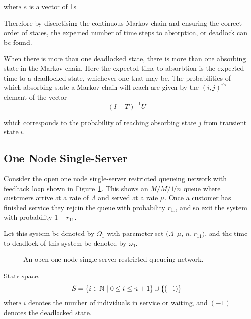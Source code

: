 \documentclass{article}
\numberwithin{equation}{section}
\begin{document}
where $e$ is a vector of 1s.

Therefore by discretising the continuous Markov chain and ensuring the correct order of states, the expected number of time steps to absorption, or deadlock can be found.

When there is more than one deadlocked state, there is more than one absorbing state in the Markov chain.
Here the expected time to absorbtion is the expected time to a deadlocked state, whichever one that may be.
The probabilities of which absorbing state a Markov chain will reach are given by the $(i, j)^{\text{th}}$ element of the vector
\begin{equation}
  (I - T)^{-1}U
\end{equation}

which corresponds to the probability of reaching absorbing state $j$ from transient state $i$.









\subsection{One Node Single-Server}\label{sec:1nodenet}

Consider the open one node single-server restricted queueing network with feedback loop shown in Figure~\ref{fig:queueingnetwork_1node}.
This shows an \(M/M/1/n\) queue where customers arrive at a rate of $\Lambda$ and served at a rate $\mu$.
Once a customer has finished service they rejoin the queue with probability $r_{11}$, and so exit the system with probability $1 - r_{11}$.

Let this system be denoted by $\Omega_1$ with parameter set $(\Lambda$, $\mu$, $n$, $r_{11})$, and the time to deadlock of this system be denoted by $\omega_1$.

\begin{figure}[!htbp]
  \begin{center}
  
  \end{center}
  \caption{An open one node single-server restricted queueing network.}
  \label{fig:queueingnetwork_1node}
\end{figure}

State space:
        \[S = \{i\in\mathbb{N} \nonscript\; | \nonscript\; 0 \leq i \leq n + 1
        \}\cup\{(-1)\}\]
where \(i\) denotes the number of individuals in service or waiting, and $(-1)$ denotes the deadlocked state.
\end{document}

